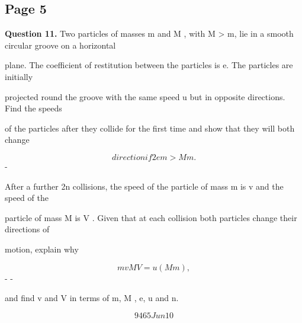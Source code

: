 \documentclass[12pt]{article}
\begin{document}
\subsection*{Page 5}
\begin{flushleft}
\bigskip\textbf{Question 11.} Two particles of masses m and M , with M > m, lie in a smooth circular groove on a horizontal\par
plane. The coefficient of restitution between the particles is e. The particles are initially\par
projected round the groove with the same speed u but in opposite directions. Find the speeds\par
of the particles after they collide for the first time and show that they will both change\par
\[direction if 2em > M m.\]
-\par
After a further 2n collisions, the speed of the particle of mass m is v and the speed of the\par
particle of mass M is V . Given that at each collision both particles change their directions of\par
motion, explain why\par
\[mv M V = u(M m),\]
- -\par
and find v and V in terms of m, M , e, u and n.\par
\[9465 Jun10\]
\end{flushleft}
\end{document}
